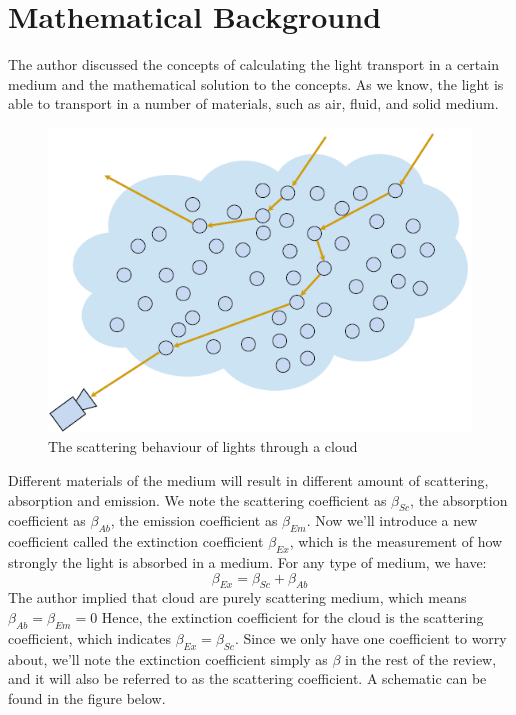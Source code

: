 \section{Mathematical Background}
The author discussed the concepts of calculating the light transport in a certain medium and the mathematical solution to the concepts. As we know, the light is able to transport in a number of materials, such as air, fluid, and solid medium. 
\begin{figure}[htp]
\begin{center}
\includegraphics[scale=0.4]{images/scattering.png}
\caption{The scattering behaviour of lights through a cloud}
\label{f5}
\end{center}
\end{figure}
Different materials of the medium will result in different amount of scattering, absorption and emission. We note the scattering coefficient as $\beta_{Sc}$, the absorption coefficient as $\beta_{Ab}$, the emission coefficient as $\beta_{Em}$. Now we'll introduce a new coefficient called the extinction coefficient $\beta_{Ex}$, which is the measurement of how strongly the light is absorbed in a medium. For any type of medium, we have:
\begin{equation}
\beta_{Ex} = \beta_{Sc} + \beta_{Ab}
\end{equation}
The author implied that cloud are purely scattering medium, which means $\beta_{Ab} = \beta_{Em} = 0$
Hence, the extinction coefficient for the cloud is the scattering coefficient, which indicates $\beta_{Ex} = \beta_{Sc}$. Since we only have one coefficient to worry about, we'll note the extinction coefficient simply as $\beta$ in the rest of the review, and it will also be referred to as the scattering coefficient. A schematic can be found in the figure below.

